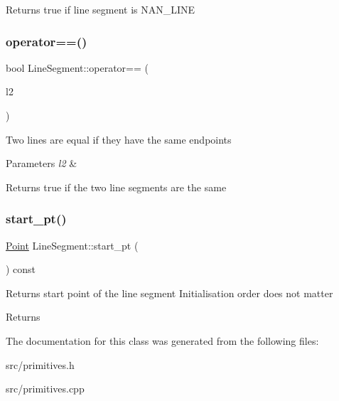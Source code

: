 \begin{DoxyReturn}{Returns}
true if line segment is N\+A\+N\+\_\+\+L\+I\+NE 
\end{DoxyReturn}
\mbox{\label{classLineSegment_ae73906b7230adbccf243c4b8dc6482b3}} 
\subsubsection{\texorpdfstring{operator==()}{operator==()}}
{\footnotesize\ttfamily bool Line\+Segment\+::operator== (\begin{DoxyParamCaption}\item[{const \hyperlink{classLineSegment}{Line\+Segment} \&}]{l2 }\end{DoxyParamCaption})}

Two lines are equal if they have the same endpoints 
\begin{DoxyParams}{Parameters}
{\em l2} & \\
\hline
\end{DoxyParams}
\begin{DoxyReturn}{Returns}
true if the two line segments are the same 
\end{DoxyReturn}
\mbox{\label{classLineSegment_abe9136323cfe46be663907cbc1e3da2d}} 
\subsubsection{\texorpdfstring{start\+\_\+pt()}{start\_pt()}}
{\footnotesize\ttfamily \hyperlink{classPoint}{Point} Line\+Segment\+::start\+\_\+pt (\begin{DoxyParamCaption}{ }\end{DoxyParamCaption}) const}

Returns start point of the line segment Initialisation order does not matter \begin{DoxyReturn}{Returns}

\end{DoxyReturn}


The documentation for this class was generated from the following files\+:\begin{DoxyCompactItemize}
\item 
src/primitives.\+h\item 
src/primitives.\+cpp\end{DoxyCompactItemize}
